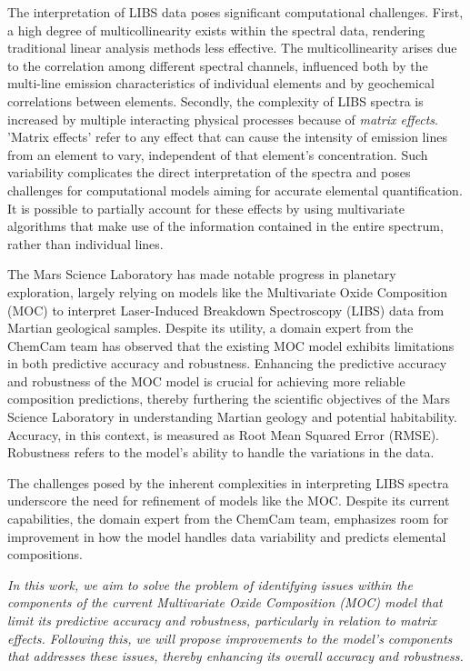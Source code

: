 The interpretation of LIBS data poses significant computational challenges.
First, a high degree of multicollinearity exists within the spectral data, rendering traditional linear analysis methods less effective.
The multicollinearity arises due to the correlation among different spectral channels, influenced both by the multi-line emission characteristics of individual elements and by geochemical correlations between elements.
Secondly, the complexity of LIBS spectra is increased by multiple interacting physical processes because of \textit{matrix effects}. 'Matrix effects' refer to any effect that can cause the intensity of emission lines from an element to vary, independent of that element's concentration. Such variability complicates the direct interpretation of the spectra and poses challenges for computational models aiming for accurate elemental quantification.
It is possible to partially account for these effects by using multivariate algorithms that make use of the information contained in the entire spectrum, rather than individual lines.\cite{andersonImprovedAccuracyQuantitative2017}

The Mars Science Laboratory has made notable progress in planetary exploration, largely relying on models like the Multivariate Oxide Composition (MOC) to interpret Laser-Induced Breakdown Spectroscopy (LIBS) data from Martian geological samples.
Despite its utility, a domain expert from the ChemCam team has observed that the existing MOC model exhibits limitations in both predictive accuracy and robustness.
Enhancing the predictive accuracy and robustness of the MOC model is crucial for achieving more reliable composition predictions, thereby furthering the scientific objectives of the Mars Science Laboratory in understanding Martian geology and potential habitability.
Accuracy, in this context, is measured as Root Mean Squared Error (RMSE).
Robustness refers to the model's ability to handle the variations in the data.

The challenges posed by the inherent complexities in interpreting LIBS spectra underscore the need for refinement of models like the MOC.
Despite its current capabilities, the domain expert from the ChemCam team, emphasizes room for improvement in how the model handles data variability and predicts elemental compositions.

\textit{In this work, we aim to solve the problem of identifying issues within the components of the current Multivariate Oxide Composition (MOC) model that limit its predictive accuracy and robustness, particularly in relation to matrix effects. Following this, we will propose improvements to the model's components that addresses these issues, thereby enhancing its overall accuracy and robustness.}

